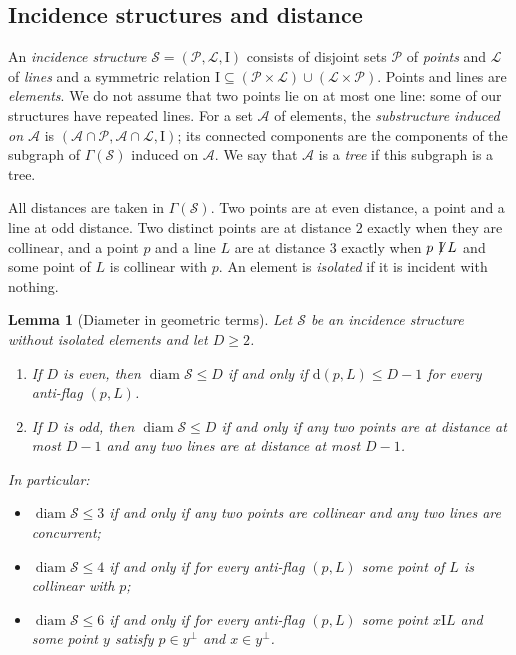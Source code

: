 \documentclass[11pt]{amsart}
\newtheorem{lemma}[theorem]{Lemma}
\theoremstyle{definition}
\theoremstyle{remark}
\newcommand{\cS}{\mathcal{S}}
\newcommand{\cP}{\mathcal{P}}
\newcommand{\cL}{\mathcal{L}}
\newcommand{\cA}{\mathcal{A}}
\newcommand{\I}{\mathrel{\mathrm{I}}}
\newcommand{\nI}{\mathrel{\not\!\mathrm{I}}}
\newcommand{\dd}{\mathrm{d}}
\newcommand{\diam}{\operatorname{diam}}
\begin{document}
\subsection{Incidence structures and distance}
An \emph{incidence structure} $\cS=(\cP,\cL,\I)$ consists of disjoint sets $\cP$ of \emph{points} and $\cL$ of \emph{lines} and a symmetric relation $\I\subseteq(\cP\times\cL)\cup(\cL\times\cP)$. Points and lines are \emph{elements}. We do not assume that two points lie on at most one line: some of our structures have repeated lines. For a set $\cA$ of elements, the \emph{substructure induced on $\cA$} is $(\cA\cap\cP,\cA\cap\cL,\I)$; its connected components are the components of the subgraph of $\Gamma(\cS)$ induced on $\cA$. We say that $\cA$ is a \emph{tree} if this subgraph is a tree.

All distances are taken in $\Gamma(\cS)$. Two points are at even distance, a point and a line at odd distance. Two distinct points are at distance $2$ exactly when they are collinear, and a point $p$ and a line $L$ are at distance $3$ exactly when $p\nI L$ and some point of $L$ is collinear with $p$. An element is \emph{isolated} if it is incident with nothing.

\begin{lemma}[Diameter in geometric terms]\label{lem:diam}
Let $\cS$ be an incidence structure without isolated elements and let $D\ge2$.
\begin{enumerate}[label=\textup{(\roman*)}]
\item If $D$ is even, then $\diam\cS\le D$ if and only if $\dd(p,L)\le D-1$ for every anti-flag $(p,L)$.
\item If $D$ is odd, then $\diam\cS\le D$ if and only if any two points are at distance at most $D-1$ and any two lines are at distance at most $D-1$.
\end{enumerate}
In particular:
\begin{itemize}[leftmargin=1.5em]
\item $\diam\cS\le3$ if and only if any two points are collinear and any two lines are concurrent;
\item $\diam\cS\le4$ if and only if for every anti-flag $(p,L)$ some point of $L$ is collinear with $p$;
\item $\diam\cS\le6$ if and only if for every anti-flag $(p,L)$ some point $x\I L$ and some point $y$ satisfy $p\in y^\perp$ and $x\in y^\perp$.
\end{itemize}
\end{lemma}
\end{document}
